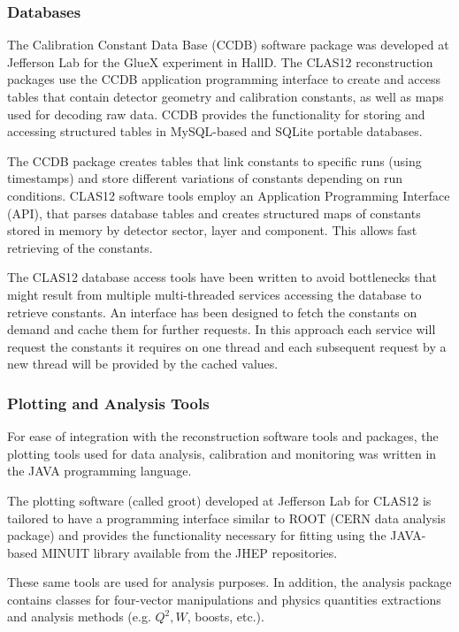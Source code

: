 \subsubsection{Databases}

The Calibration Constant Data Base (CCDB) software package was developed at Jefferson Lab for the GlueX experiment
in HallD.  The CLAS12 reconstruction packages use the CCDB application programming interface to create and access
tables that contain detector geometry and calibration constants, as well as maps used for decoding raw data.
CCDB provides the functionality for storing and accessing
structured tables in MySQL-based and SQLite portable databases.

The CCDB package creates
tables that link constants to specific runs (using timestamps) and store different variations of constants depending on run
conditions. CLAS12 software tools employ an Application Programming Interface (API), that parses database tables and creates
structured maps of constants stored in  memory by detector sector, layer and component. This allows fast retrieving of the
constants.

The CLAS12 database access tools have been written to avoid bottlenecks that might result from multiple multi-threaded
services accessing the database to retrieve constants.  An interface has been designed to fetch the constants
on demand and cache them for further requests. In this approach each service will request the
constants it requires on one thread and each subsequent request by a new thread will be provided by the cached values.

\subsubsection{Plotting and Analysis Tools}

For ease of integration with the reconstruction software tools and packages, the plotting tools used for data
analysis, calibration and monitoring was written in the JAVA programming language.

The plotting software (called groot) developed at Jefferson Lab for CLAS12 is tailored to have a programming
interface similar to ROOT
(CERN data analysis package) and provides the functionality necessary for
fitting using the JAVA-based MINUIT library available from the JHEP repositories.

These same tools are used for analysis purposes. In addition, the analysis package
contains classes for four-vector manipulations and physics quantities extractions and
analysis methods (e.g. $Q^2, W$, boosts, etc.).

